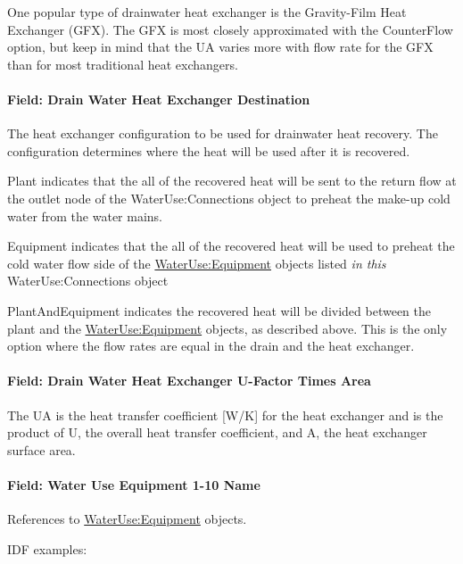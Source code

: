 One popular type of drainwater heat exchanger is the Gravity-Film Heat Exchanger (GFX). The GFX is most closely approximated with the CounterFlow option, but keep in mind that the UA varies more with flow rate for the GFX than for most traditional heat exchangers.

\paragraph{Field: Drain Water Heat Exchanger Destination}\label{field-drain-water-heat-exchanger-destination}

The heat exchanger configuration to be used for drainwater heat recovery. The configuration determines where the heat will be used after it is recovered.

Plant indicates that the all of the recovered heat will be sent to the return flow at the outlet node of the WaterUse:Connections object to preheat the make-up cold water from the water mains.

Equipment indicates that the all of the recovered heat will be used to preheat the cold water flow side of the \hyperref[wateruseequipment]{WaterUse:Equipment} objects listed \emph{in this} WaterUse:Connections object

PlantAndEquipment indicates the recovered heat will be divided between the plant and the \hyperref[wateruseequipment]{WaterUse:Equipment} objects, as described above. This is the only option where the flow rates are equal in the drain and the heat exchanger.

\paragraph{Field: Drain Water Heat Exchanger U-Factor Times Area}\label{field-drain-water-heat-exchanger-u-factor-times-area}

The UA is the heat transfer coefficient {[}W/K{]} for the heat exchanger and is the product of U, the overall heat transfer coefficient, and A, the heat exchanger surface area.

\paragraph{Field: Water Use Equipment 1-10 Name}\label{field-water-use-equipment-1-10-name}

References to \hyperref[wateruseequipment]{WaterUse:Equipment} objects.

IDF examples:

